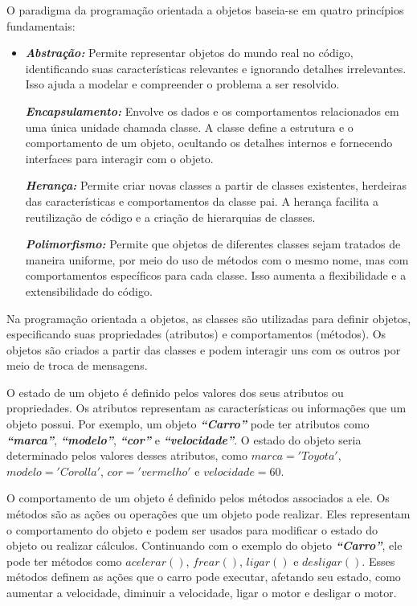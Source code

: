 \documentclass[a4paper, 12pt, onecolumn,singlespacing]{article}
\begin{document}
	O paradigma da programação orientada a objetos baseia-se em quatro princípios fundamentais:
	\begin{itemize}
		\item 	\textbf{\textit{Abstração:}} Permite representar objetos do mundo real no código, identificando suas características relevantes e ignorando detalhes irrelevantes. Isso ajuda a modelar e compreender o problema a ser resolvido.
		
		\textbf{\textit{Encapsulamento:}} Envolve os dados e os comportamentos relacionados em uma única unidade chamada classe. A classe define a estrutura e o comportamento de um objeto, ocultando os detalhes internos e fornecendo interfaces para interagir com o objeto.
		
		\textbf{\textit{Herança:}} Permite criar novas classes a partir de classes existentes, herdeiras das características e comportamentos da classe pai. A herança facilita a reutilização de código e a criação de hierarquias de classes.
		
		\textbf{\textit{Polimorfismo:}} Permite que objetos de diferentes classes sejam tratados de maneira uniforme, por meio do uso de métodos com o mesmo nome, mas com comportamentos específicos para cada classe. Isso aumenta a flexibilidade e a extensibilidade do código.
		
	\end{itemize}
	
	Na programação orientada a objetos, as classes são utilizadas para definir objetos, especificando suas propriedades (atributos) e comportamentos (métodos). Os objetos são criados a partir das classes e podem interagir uns com os outros por meio de troca de mensagens.
	
	O estado de um objeto é definido pelos valores dos seus atributos ou propriedades. Os atributos representam as características ou informações que um objeto possui. Por exemplo, um objeto \textbf{\textit{``Carro''}} pode ter atributos como \textbf{\textit{``marca''}}, \textbf{\textit{``modelo''}}, \textbf{\textit{``cor''}} e \textbf{\textit{``velocidade''}}. O estado do objeto seria determinado pelos valores desses atributos, como $marca = 'Toyota'$, $modelo = 'Corolla'$, $cor = 'vermelho'$ e $velocidade = 60$.
	
	O comportamento de um objeto é definido pelos métodos associados a ele. Os métodos são as ações ou operações que um objeto pode realizar. Eles representam o comportamento do objeto e podem ser usados para modificar o estado do objeto ou realizar cálculos. Continuando com o exemplo do objeto \textbf{\textit{``Carro''}}, ele pode ter métodos como $acelerar()$, $frear()$, $ligar()$ e $desligar()$. Esses métodos definem as ações que o carro pode executar, afetando seu estado, como aumentar a velocidade, diminuir a velocidade, ligar o motor e desligar o motor.
	
\end{document}
